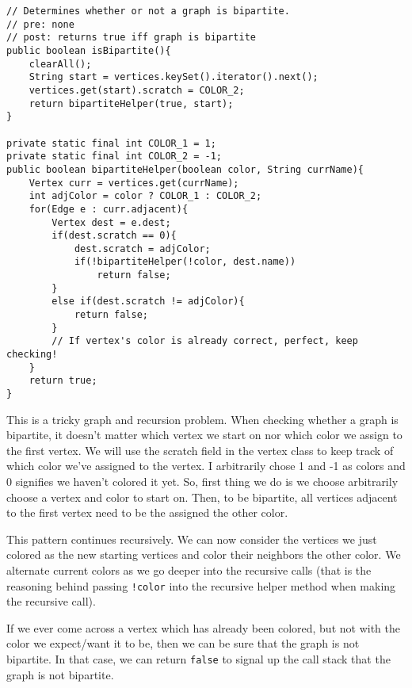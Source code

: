 \documentclass[12pt,letter]{article}
\begin{document}
\clearpage
\begin{verbatim}
// Determines whether or not a graph is bipartite.
// pre: none
// post: returns true iff graph is bipartite
public boolean isBipartite(){
    clearAll();
    String start = vertices.keySet().iterator().next();
    vertices.get(start).scratch = COLOR_2;
    return bipartiteHelper(true, start);
}

private static final int COLOR_1 = 1;
private static final int COLOR_2 = -1;
public boolean bipartiteHelper(boolean color, String currName){
    Vertex curr = vertices.get(currName);
    int adjColor = color ? COLOR_1 : COLOR_2;
    for(Edge e : curr.adjacent){
        Vertex dest = e.dest;
        if(dest.scratch == 0){
            dest.scratch = adjColor;
            if(!bipartiteHelper(!color, dest.name))
                return false;
        }
        else if(dest.scratch != adjColor){
            return false;
        }
        // If vertex's color is already correct, perfect, keep checking!
    }
    return true;
}
\end{verbatim}

\vspace{4pt}
\noindent This is a tricky graph and recursion problem. When checking whether a graph is bipartite, it doesn't
matter which vertex we start on nor which color we assign to the first vertex. We will use the scratch field in the vertex class
to keep track of which color we've assigned to the vertex. I arbitrarily chose 1 and -1 as colors and 0 signifies we haven't colored
it yet. So, first thing we do is we choose arbitrarily choose a vertex and color to start on. 
Then, to be bipartite, all vertices adjacent to the first vertex need to be the assigned the other color.\newline 

\noindent This pattern continues recursively. We can now consider the vertices we just colored as the new starting vertices 
and color their neighbors the other color. We alternate current colors as we go deeper into the recursive calls 
(that is the reasoning behind passing \texttt{!color} into the recursive helper method when making the recursive call). \newline

\noindent If we ever come across a vertex which has already been colored, but not with the color we expect/want it to be,
then we can be sure that the graph is not bipartite. In that case, we can return \texttt{false} to signal up the call stack
that the graph is not bipartite.
 
\end{document}
